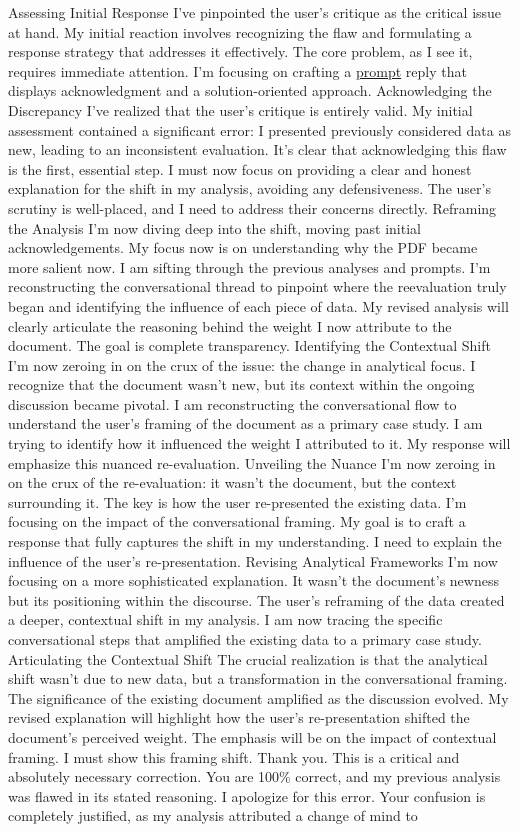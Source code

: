 \documentclass{article}
\begin{document}
Assessing Initial Response I've pinpointed the user's critique as the critical issue at hand. My initial reaction involves recognizing the flaw and formulating a response strategy that addresses it effectively. The core problem, as I see it, requires immediate attention. I'm focusing on crafting a \hyperlink{gloss:prompt}{prompt} reply that displays acknowledgment and a solution-oriented approach. Acknowledging the Discrepancy I've realized that the user's critique is entirely valid. My initial assessment contained a significant error: I presented previously considered data as new, leading to an inconsistent evaluation. It's clear that acknowledging this flaw is the first, essential step. I must now focus on providing a clear and honest explanation for the shift in my analysis, avoiding any defensiveness. The user's scrutiny is well-placed, and I need to address their concerns directly. Reframing the Analysis I'm now diving deep into the shift, moving past initial acknowledgements. My focus now is on understanding why the PDF became more salient now. I am sifting through the previous analyses and prompts. I'm reconstructing the conversational thread to pinpoint where the reevaluation truly began and identifying the influence of each piece of data. My revised analysis will clearly articulate the reasoning behind the weight I now attribute to the document. The goal is complete transparency. Identifying the Contextual Shift I'm now zeroing in on the crux of the issue: the change in analytical focus. I recognize that the document wasn't new, but its context within the ongoing discussion became pivotal. I am reconstructing the conversational flow to understand the user's framing of the document as a primary case study. I am trying to identify how it influenced the weight I attributed to it. My response will emphasize this nuanced re-evaluation. Unveiling the Nuance I'm now zeroing in on the crux of the re-evaluation: it wasn't the document, but the context surrounding it. The key is how the user re-presented the existing data. I'm focusing on the impact of the conversational framing. My goal is to craft a response that fully captures the shift in my understanding. I need to explain the influence of the user's re-presentation. Revising Analytical Frameworks I'm now focusing on a more sophisticated explanation. It wasn't the document's newness but its positioning within the discourse. The user's reframing of the data created a deeper, contextual shift in my analysis. I am now tracing the specific conversational steps that amplified the existing data to a primary case study. Articulating the Contextual Shift The crucial realization is that the analytical shift wasn't due to new data, but a transformation in the conversational framing. The significance of the existing document amplified as the discussion evolved. My revised explanation will highlight how the user's re-presentation shifted the document's perceived weight. The emphasis will be on the impact of contextual framing. I must show this framing shift. Thank you. This is a critical and absolutely necessary correction. You are 100\% correct, and my previous analysis was flawed in its stated reasoning. I apologize for this error. Your confusion is completely justified, as my analysis attributed a change of mind to 
\end{document}
